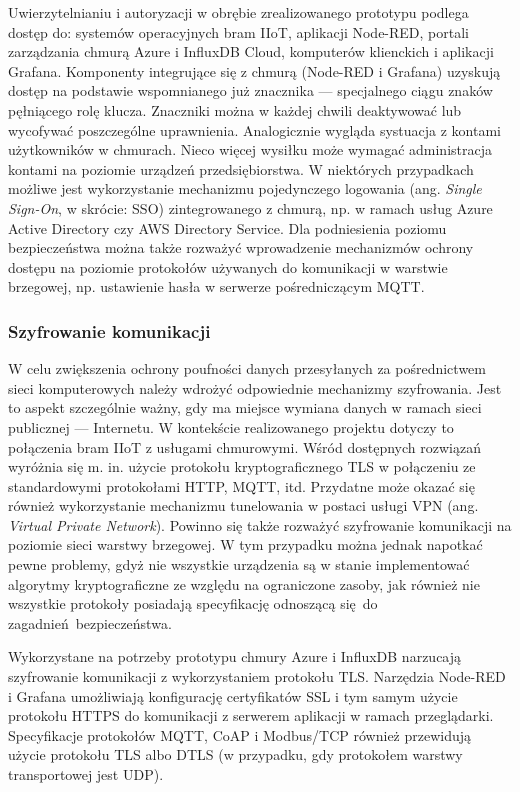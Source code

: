 \documentclass[a4paper, 12pt, twoside]{article}
\begin{document}
Uwierzytelnianiu i autoryzacji w obrębie zrealizowanego prototypu podlega dostęp do: systemów operacyjnych 
bram IIoT, aplikacji Node-RED, portali zarządzania chmurą Azure i InfluxDB Cloud,
komputerów klienckich i aplikacji Grafana. Komponenty integrujące się z chmurą
(Node-RED i Grafana) uzyskują dostęp na podstawie wspomnianego już znacznika ---
specjalnego ciągu znaków pęłniącego rolę klucza. Znaczniki można w każdej
chwili deaktywować lub wycofywać poszczególne uprawnienia. Analogicznie wygląda
systuacja z kontami użytkowników w chmurach. Nieco więcej wysiłku może wymagać 
administracja kontami na poziomie urządzeń przedsiębiorstwa. W niektórych 
przypadkach możliwe jest wykorzystanie mechanizmu pojedynczego logowania 
(ang. \emph{Single Sign-On}, w skrócie: SSO) zintegrowanego z chmurą, np. 
w ramach usług Azure Active Directory czy AWS Directory Service. 
Dla podniesienia poziomu bezpieczeństwa można także rozważyć wprowadzenie
mechanizmów ochrony dostępu na poziomie protokołów używanych do komunikacji 
w warstwie brzegowej, np. ustawienie hasła w serwerze pośredniczącym MQTT. 

\subsubsection{Szyfrowanie komunikacji}

W celu zwiększenia ochrony poufności danych przesyłanych za pośrednictwem sieci
komputerowych należy wdrożyć odpowiednie mechanizmy szyfrowania. Jest to aspekt
szczególnie ważny, gdy ma miejsce wymiana danych w ramach sieci publicznej --- Internetu.
W kontekście realizowanego projektu dotyczy to połączenia bram IIoT z usługami chmurowymi.
Wśród dostępnych rozwiązań wyróżnia się m. in. użycie protokołu kryptograficznego TLS w połączeniu
ze standardowymi protokołami HTTP, MQTT, itd. Przydatne może okazać się również
wykorzystanie mechanizmu tunelowania w postaci usługi VPN (ang. \emph{Virtual Private Network}).
Powinno się także rozważyć szyfrowanie komunikacji na poziomie sieci warstwy brzegowej.
W tym przypadku można jednak napotkać pewne problemy, gdyż nie wszystkie urządzenia
są w stanie implementować algorytmy kryptograficzne ze względu 
na ograniczone zasoby, jak również nie wszystkie protokoły posiadają specyfikację
odnoszącą się do zagadnień bezpieczeństwa.

Wykorzystane na potrzeby prototypu chmury Azure i InfluxDB narzucają szyfrowanie
komunikacji z wykorzystaniem protokołu TLS. Narzędzia Node-RED i Grafana
umożliwiają konfigurację certyfikatów SSL i tym samym użycie protokołu
HTTPS do komunikacji z serwerem aplikacji w ramach przeglądarki. Specyfikacje
protokołów MQTT, CoAP i Modbus/TCP również przewidują użycie protokołu TLS albo
DTLS (w przypadku, gdy protokołem warstwy transportowej jest UDP).
\end{document}
